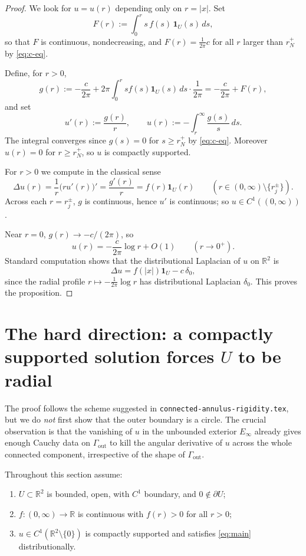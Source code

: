 \documentclass[11pt]{article}
\newcommand{\R}{\mathbb R}
\newcommand{\1}{\mathbf 1}
\begin{document}
\begin{proof}
We look for $u=u(r)$ depending only on $r=|x|$. Set
\[
F(r):=\int_0^r s\,f(s)\,\1_U(s)\,ds,
\]
so that $F$ is continuous, nondecreasing, and $F(r)=\frac{1}{2\pi}c$ for all $r$ larger than
$r_N^+$ by \eqref{eq:c-eq}.

Define, for $r>0$,
\[
g(r):=-\frac{c}{2\pi}+2\pi\int_0^r sf(s)\1_U(s)\,ds\cdot\frac1{2\pi}
      =-\frac{c}{2\pi}+F(r),
\]
and set
\[
u'(r):=\frac{g(r)}{r},\qquad u(r):=-\int_r^{\infty}\frac{g(s)}{s}\,ds.
\]
The integral converges since $g(s)=0$ for $s\ge r_N^+$ by \eqref{eq:c-eq}. Moreover
$u(r)=0$ for $r\ge r_N^+$, so $u$ is compactly supported.

For $r>0$ we compute in the classical sense
\[
\Delta u(r)=\frac1r\bigl(ru'(r)\bigr)'=\frac{g'(r)}{r}=f(r)\1_U(r)
\qquad(r\in(0,\infty)\setminus\{r_j^\pm\}).
\]
Across each $r=r_j^\pm$, $g$ is continuous, hence $u'$ is continuous; so
$u\in C^1((0,\infty))$.

Near $r=0$, $g(r)\to -c/(2\pi)$, so
\[
u(r)=-\frac{c}{2\pi}\log r+O(1)\qquad(r\to 0^+).
\]
Standard computation shows that the distributional Laplacian of $u$ on $\R^2$ is
\[
\Delta u=f(|x|)\1_U-c\,\delta_0,
\]
since the radial profile $r\mapsto -\frac{1}{2\pi}\log r$ has distributional Laplacian
$\delta_0$. This proves the proposition.
\end{proof}

\section{The hard direction: a compactly supported solution forces $U$ to be radial}

The proof follows the scheme suggested in \texttt{connected-annulus-rigidity.tex}, but we
do \emph{not} first show that the outer boundary is a circle. The crucial observation is
that the vanishing of $u$ in the unbounded exterior $E_\infty$ already gives enough Cauchy
data on $\Gamma_{\mathrm{out}}$ to kill the angular derivative of $u$ across the whole
connected component, irrespective of the shape of $\Gamma_{\mathrm{out}}$.

Throughout this section assume:
\begin{enumerate}[label=(H\arabic*)]
\item $U\subset\R^2$ is bounded, open, with $C^1$ boundary, and $0\notin\partial U$;
\item $f:(0,\infty)\to\R$ is continuous with $f(r)>0$ for all $r>0$;
\item $u\in C^1(\R^2\setminus\{0\})$ is compactly supported and
satisfies \eqref{eq:main} distributionally.
\end{enumerate}
\end{document}
